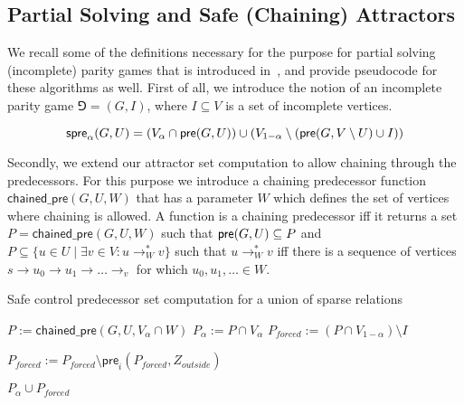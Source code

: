 \documentclass{article}
\newcommand{\var}[1]{\ensuremath{\textit{#1}}}
\begin{document}
\newpage
\subsection{Partial Solving and Safe (Chaining) Attractors}

We recall some of the definitions necessary for the purpose for partial solving (incomplete) parity games that is introduced in~\cite{DBLP:conf/tacas/LaveauxWW22}, and provide pseudocode for these algorithms as well.
First of all, we introduce the notion of an incomplete parity game $\Game = (G, I)$, where $I \subseteq V$ is a set of incomplete vertices.

\begin{equation*}
  \textsf{spre}_{\alpha}(G,U) = (V_{\alpha} \cap \textsf{pre}(G,U)) \cup (V_{1-\alpha} \setminus (\textsf{pre}(G,V \setminus U) \cup I))
\end{equation*}

Secondly, we extend our attractor set computation to allow chaining through the predecessors.
For this purpose we introduce a chaining predecessor function $\textsf{chained\_pre}(G, U, W)$ that has a parameter $W$ which defines the set of vertices where chaining is allowed.
A function is a chaining predecessor iff it returns a set $P = \textsf{chained\_pre}(G, U, W)$ such that $\textsf{pre}(G,U) \subseteq P$ and $P \subseteq \{ u \in U \mid \exists v \in V: u \rightarrow_W^* v \}$ such that $u \rightarrow_W^* v$ iff there is a sequence of vertices $s \rightarrow u_0 \rightarrow u_1 \rightarrow \ldots \rightarrow _v $ for which $u_0, u_1, \ldots \in W$.
 
 \begin{algorithm}[H]
 \caption{Safe control predecessor set computation for a union of sparse relations}
 \label{alg:safe_control_predecessor}
 \begin{algorithmic}[1]
 \Function{SPre$_\alpha$}{$\var{G} = (V, E, r, (V_0, V_1)$, $\var{U}$, $\var{Z}_\var{outside}, \var{I}, \var{W}$}
   \State $\var{P} := \textsf{chained\_pre}(\var{G}, \var{U}, V_\alpha \cap \var{W})$
   \State $\var{P}_\alpha := P \cap V_\alpha$
   \State $\var{P}_\var{forced} := (P \cap V_{1 - \alpha}) \setminus I$
   
     \State $\var{P}_\var{forced} := \var{P}_\var{forced} \setminus \textsf{pre}_i(\var{P}_\textit{forced}, \var{Z}_\var{outside})$  
   \EndFor
   
   \State \Return $\var{P}_\alpha \cup \var{P}_\var{forced}$
 \EndFunction
 \end{algorithmic}
 \end{algorithm}
\end{document}

